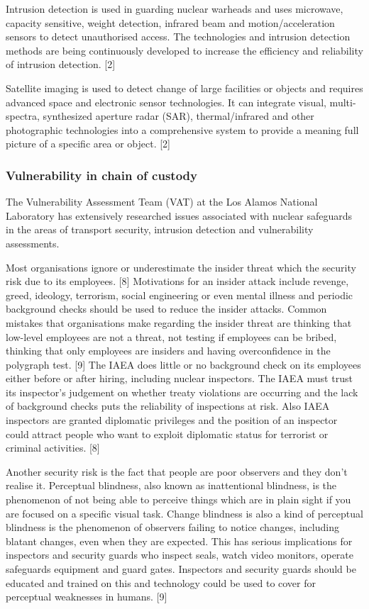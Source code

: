 \documentclass[twocolumn,a4paper]{article}
\begin{document}
Intrusion detection is used in guarding nuclear warheads and uses microwave, capacity sensitive,
weight detection, infrared beam and motion/acceleration sensors to detect unauthorised access.
The technologies and intrusion detection methods are being continuously developed to increase the
efficiency and reliability of intrusion detection. [2]

Satellite imaging is used to detect change of large facilities or objects and requires advanced space
and electronic sensor technologies. It can integrate visual, multi-spectra, synthesized aperture radar
(SAR), thermal/infrared and other photographic technologies into a comprehensive system to
provide a meaning full picture of a specific area or object. [2]

\subsubsection{Vulnerability in chain of custody}
The Vulnerability Assessment Team (VAT) at the Los Alamos National Laboratory has extensively
researched issues associated with nuclear safeguards in the areas of transport security, intrusion
detection and vulnerability assessments.

Most organisations ignore or underestimate the insider threat which the security risk due to its 
employees. [8] Motivations for an insider attack include revenge, greed, ideology, terrorism, 
social engineering or even mental illness and periodic background checks should be used to reduce 
the insider attacks. Common mistakes that organisations make regarding the insider threat are thinking 
that low-level employees are not a threat, not testing if employees can be bribed, thinking that only 
employees are insiders and having overconfidence in the polygraph test. [9] The IAEA does little or no 
background check on its employees either before or after hiring, including nuclear inspectors. The 
IAEA must trust its inspector’s judgement on whether treaty violations are occurring and the lack of 
background checks puts the reliability of inspections at risk. Also IAEA inspectors are granted 
diplomatic privileges and the position of an inspector could attract people who want to exploit 
diplomatic status for terrorist or criminal activities. [8]

Another security risk is the fact that people are poor observers and they don't realise it. Perceptual 
blindness, also known as inattentional blindness, is the phenomenon of not being able to perceive things 
which are in plain sight if you are focused on a specific visual task. Change blindness is also a kind of 
perceptual blindness is the phenomenon of observers failing to notice changes, including blatant changes, 
even when they are expected. This has serious implications for inspectors and security guards who inspect 
seals, watch video monitors, operate safeguards equipment and guard gates. Inspectors and security guards 
should be educated and trained on this and technology could be used to cover for perceptual weaknesses in 
humans. [9]
\end{document}
